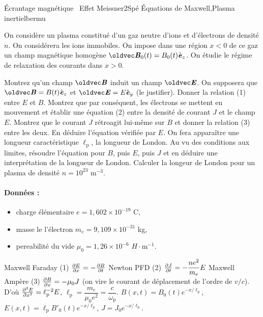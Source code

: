 \begin{exercise}{\'Ecrantage magnétique \textbullet\ Effet Meissner}{2}{Spé}
{\'Equations de Maxwell,Plasma inertiel}{bermu}

On considère un plasma constitué d'un gaz neutre d'ions et d'électrons de densité $n$. On considérera les ions immobiles. On impose dans une région $x<0$ de ce gaz un champ magnétique homogène $\vB_0(t) = B_0(t) \ve_z$. On étudie le régime de relaxation des courants dans $x>0$.

\begin{questions}
    \question Montrez qu'un champ $\vB$ induit un champ $\vE$. On supposera que $\vB = B(t)\ve_z$ et $\vE = E\ve_y$ (le justifier). Donner la relation (1) entre $E$ et $B$.
    \question Montrez que par conséquent, les électrons se mettent en mouvement et établir une équation (2) entre la densité de courant $J$ et le champ $E$.
    \question Montrez que le courant $J$ rétroagit lui-même sur $B$ et donner la relation (3) entre les deux.
    \question En déduire l'équation vérifiée par $E$. On fera apparaître une longueur caractéristique $\ell_\text{p}$, la longueur de London.
    \question Au vu des conditions aux limites, résoudre l'équation pour $B$, puis $E$, puis $J$ et en déduire une interprétation de la longueur de London.
    \question Calculer la longeur de London pour un plasma de densité $n = 10^{23}$ m$^{-3}$.
\end{questions}

\paragraph{Données :}
\begin{itemize}
    \item charge élémentaire $e = 1,602\times 10^{-19}$ C,
    \item masse le l'électron $m_e = 9,109\times 10^{-31}$ kg,
    \item pereabilité du vide $\mu_0 = 1,26 \times 10^{-6}$ $H\cdot$m$^{-1}$.
\end{itemize}
\end{exercise}

\begin{solution}
\begin{questions}
    \question Maxwell Faraday (1) $\pdv{E}{x} = -\pdv{B}{t}$
    \question Newton PFD (2) $\pdv{J}{t} = -\dfrac{ne^2}{m_e} E$
    \question Maxwell Ampère (3) $\pdv{B}{x} = -\mu_0 J$ (on vire le courant de déplacement de l'ordre de $v/c$).
    \question D'où $\pdv[2]{E}{x} = \ell_\text{p}^{-2}E$, $\ell_\text{p} = \dfrac{m_e}{\mu_0 e^2} = \dfrac{c}{\omega_\text{p}}$.
    \question $B(x,t) = B_0(t) e^{-x/\ell_\text{p}}$, $E(x,t) = \ell_\text{p} B'_0(t) e^{-x/\ell_\text{p}}$, $J = J_0 e^{-x/\ell_\text{p}}$.
\end{questions}
\end{solution}






